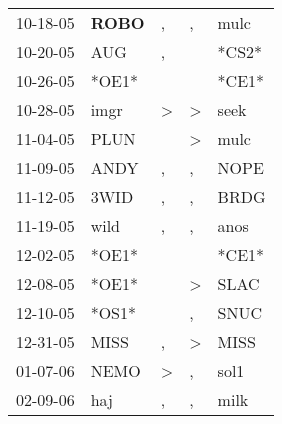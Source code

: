 \begin{supertabular}{p{0.07\textwidth}p{0.06\textwidth}p{0.02\textwidth}p{0.02\textwidth}p{0.06\textwidth}}
          10-18-05\textsuperscript{} &  \textbf{ROBO\textsuperscript{}} &                , &                , &           mulc\textsuperscript{} \\
          10-20-05\textsuperscript{} &            AUG\textsuperscript{} &                , &                  &                            *CS2* \\
          10-26-05\textsuperscript{} &                            *OE1* &                  &                  &                            *CE1* \\
          10-28-05\textsuperscript{} &           imgr\textsuperscript{} &     \textgreater &     \textgreater &           seek\textsuperscript{} \\
          11-04-05\textsuperscript{} &           PLUN\textsuperscript{} &                  &     \textgreater &           mulc\textsuperscript{} \\
          11-09-05\textsuperscript{} &           ANDY\textsuperscript{} &                , &                , &           NOPE\textsuperscript{} \\
          11-12-05\textsuperscript{} &           3WID\textsuperscript{} &                , &                , &           BRDG\textsuperscript{} \\
          11-19-05\textsuperscript{} &           wild\textsuperscript{} &                , &                , &           anos\textsuperscript{} \\
          12-02-05\textsuperscript{} &                            *OE1* &                  &                  &                            *CE1* \\
          12-08-05\textsuperscript{} &                            *OE1* &                  &     \textgreater &           SLAC\textsuperscript{} \\
          12-10-05\textsuperscript{} &                            *OS1* &                  &                , &           SNUC\textsuperscript{} \\
          12-31-05\textsuperscript{} &           MISS\textsuperscript{} &                , &     \textgreater &           MISS\textsuperscript{} \\
          01-07-06\textsuperscript{} &           NEMO\textsuperscript{} &     \textgreater &                , &           sol1\textsuperscript{} \\
          02-09-06\textsuperscript{} &            haj\textsuperscript{} &                , &                , &           milk\textsuperscript{} \\

\end{supertabular}
